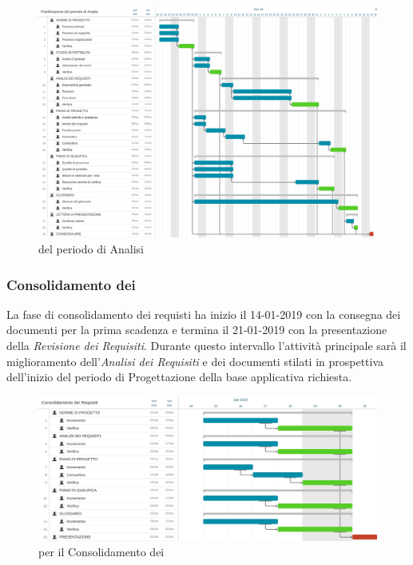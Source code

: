 \begin{figure}[htbp]
	\centering
	\includegraphics[width=15cm,keepaspectratio]{../includes/pics/grafici/Gantt_analisi.jpeg}
	\caption{\label{fig:mission} del periodo di Analisi}
\end{figure}

\clearpage
\subsubsection{Consolidamento dei }
La fase di consolidamento dei requisti ha inizio il 14-01-2019 con la consegna dei documenti per la prima scadenza e termina il 21-01-2019 con la presentazione della \emph{Revisione dei Requisiti}. Durante questo intervallo l'attività principale sarà il miglioramento dell'\emph{Analisi dei Requisiti} e dei documenti stilati in prospettiva dell'inizio del periodo di Progettazione della base applicativa richiesta.\\
\begin{figure}[htbp]
	\centering
	\includegraphics[width=15cm,keepaspectratio]{../includes/pics/grafici/Gantt_consolidamento_requisiti.jpeg}
	\caption{\label{fig:mission} per il Consolidamento dei }
\end{figure}

